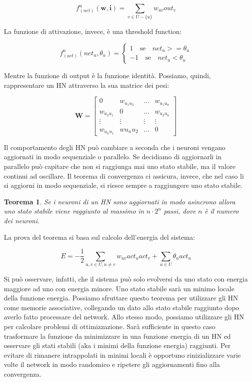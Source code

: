 \documentclass[10pt,a4paper]{article}
\newtheorem{theorem}{Teorema}
\newcommand{\ww}{\mathbf{w}}
\newcommand{\ii}{\mathbf{i}}
\begin{document}
$$
f_{(net)}^u(\ww,\ii) = \sum_{v \in U - \{u\}} w_{uv} out_v 
$$

La funzione di attivazione, invece, è una threshold function:

$$
f_{(act)}^u(net_u,\theta_u) = \begin{cases}
				1 \quad \text{se} \quad net_u >= \theta_u \\
				-1 \quad \text{se} \quad net_u < \theta_u
							  \end{cases}
$$

Mentre la funzione di output è la funzione identità. Possiamo, quindi, rappresentare un HN attraverso la sua matrice dei pesi:

$$
\mathbf{W} = \begin{bmatrix} 
			0 & w_{u_1 u_2} & \dots & w_{u_1 u_n} \\
			w_{u_2 u_1} & 0 & \dots & w_{u_2 u_n} \\
			\vdots & \vdots & \vdots & \vdots \\
			w_{u_n u_1} & w{u_n u_2} & \dots & 0
			\end{bmatrix}
$$

Il comportamento degli HN può cambiare a seconda che i neuroni vengano aggiornati in modo sequenziale o parallelo. Se decidiamo di aggiornarli in parallelo può capitare che non si raggiunga mai uno stato stabile, ma il valore continui ad oscillare. Il teorema di convergenza ci assicura, invece, che nel caso li si aggiorni in modo sequenziale, si riesce sempre a raggiungere uno stato stabile.

\begin{theorem}
\emph{Se i neuroni di un HN sono aggiornati in modo asincrono allora uno stato stabile viene raggiunto al massimo in $n\cdot 2^n$ passi, dove $n$ è il numero dei neuroni.}
\end{theorem}

La prova del teorema si basa sul calcolo dell'energia del sistema:

$$
E = -\frac{1}{2} \sum_{u,v \in U, u \neq v} w_{uv}act_u act_v + \sum_{u \in U} \theta_u act_u
$$

Si può osservare, infatti, che il sistema può solo evolversi da uno stato con energia maggiore ad uno con energia minore. Uno stato stabile sarà un minimo locale della funzione energia. Possiamo sfruttare questo teorema per utilizzare gli HN come memorie associative, collegando un dato allo stato stabile raggiunto dopo averlo fatto processare del network. Allo stesso modo, possiamo utilizzare gli HN per calcolare problemi di ottimizzazione. Sarà sufficiente in questo caso trasformare la funzione da minimizzare in una funzione energia di un HN ed osservare gli stati stabili (aka i minimi della funzione energia) raggiunti. Per evitare di rimanere intrappolati in minimi locali è opportuno rinizializzare varie volte il network in modo randomico e ripetere gli aggiornamenti fino alla convergenza.
\end{document}
